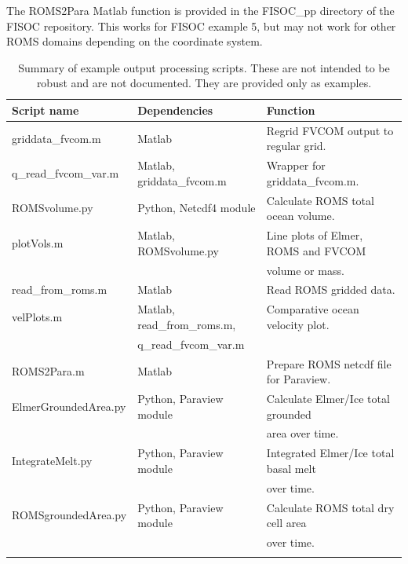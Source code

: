 \documentclass[11pt]{article}
\begin{document}
The ROMS2Para Matlab function is provided in the FISOC\_pp directory of the FISOC repository. 
This works for FISOC example 5, but may not work for other ROMS domains depending on the
coordinate system. 

\begin{table}
  \begin{center}
    \begin{tabular}{ l|l|l }
      \textbf{Script name}    & \textbf{Dependencies}       & \textbf{Function} \\
      \hline
      griddata\_fvcom.m       & Matlab                      & Regrid FVCOM output to regular grid. \\
      q\_read\_fvcom\_var.m   & Matlab, griddata\_fvcom.m   & Wrapper for griddata\_fvcom.m. \\
      ROMSvolume.py           & Python, Netcdf4 module      & Calculate ROMS total ocean volume. \\
      plotVols.m              & Matlab, ROMSvolume.py       & Line plots of Elmer, ROMS and FVCOM \\
                              &                             & volume or mass. \\
      read\_from\_roms.m      & Matlab                      & Read ROMS gridded data. \\
      velPlots.m              & Matlab, read\_from\_roms.m, & Comparative ocean velocity plot.  \\
                              & q\_read\_fvcom\_var.m       &  \\
      ROMS2Para.m             & Matlab                      & Prepare ROMS netcdf file for Paraview. \\
      ElmerGroundedArea.py    & Python, Paraview module     & Calculate Elmer/Ice total grounded   \\
                              &                             & area over time. \\
      IntegrateMelt.py        & Python, Paraview module     & Integrated Elmer/Ice total basal melt \\
                              &                             & over time.  \\
      ROMSgroundedArea.py     & Python, Paraview module     & Calculate ROMS total dry cell area  \\
                              &                             & over time. \\ \\
    \end{tabular}
  \end{center}
  \caption{
    Summary of example output processing scripts.
    These are not intended to be robust and are not documented.
    They are provided only as examples. 
  }
  \label{tab:ppscripts}
\end{table}
\end{document}
